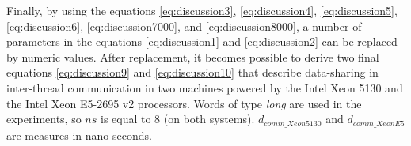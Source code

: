 Finally, by using the equations \ref{eq:discussion3}, \ref{eq:discussion4}, \ref{eq:discussion5}, \ref{eq:discussion6}, \ref{eq:discussion7000}, and \ref{eq:discussion8000}, a number of parameters in the equations \ref{eq:discussion1} and \ref{eq:discussion2} can be replaced by numeric values. After replacement, it becomes possible to derive two final equations \ref{eq:discussion9} and \ref{eq:discussion10} that describe data-sharing in inter-thread communication in two machines powered by the Intel Xeon 5130 and the Intel Xeon E5-2695 v2 processors. Words of type \textit{long} are used in the experiments, so $ns$ is equal to 8 (on both systems). $d_{comm\_Xeon5130}$ and $d_{comm\_XeonE5}$ are measures in nano-seconds.


